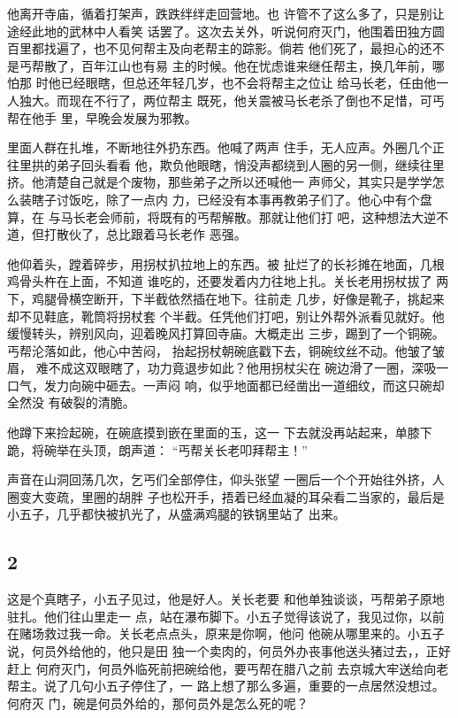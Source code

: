 他离开寺庙，循着打架声，跌跌绊绊走回营地。也
许管不了这么多了，只是别让途经此地的武林中人看笑
话罢了。这次去关外，听说何府灭门，他围着田独方圆
百里都找遍了，也不见何帮主及向老帮主的踪影。倘若
他们死了，最担心的还不是丐帮散了，百年江山也有易
主的时候。他在忧虑谁来继任帮主，换几年前，哪怕那
时他已经眼瞎，但总还年轻几岁，也不会将帮主之位让
给马长老，任由他一人独大。而现在不行了，两位帮主
既死，他关震被马长老杀了倒也不足惜，可丐帮在他手
里，早晚会发展为邪教。

里面人群在扎堆，不断地往外扔东西。他喊了两声
住手，无人应声。外圈几个正往里拱的弟子回头看看
他，欺负他眼瞎，悄没声都绕到人圈的另一侧，继续往里
挤。他清楚自己就是个废物，那些弟子之所以还喊他一
声师父，其实只是学学怎么装瞎子讨饭吃，除了一点内
力，已经没有本事再教弟子们了。他心中有个盘算，在
与马长老会师前，将既有的丐帮解散。那就让他们打
吧，这种想法大逆不道，但打散伙了，总比跟着马长老作
恶强。

他仰着头，蹚着碎步，用拐杖扒拉地上的东西。被
扯烂了的长衫摊在地面，几根鸡骨头杵在上面，不知道
谁吃的，还要发着内力往地上扎。关长老用拐杖拔了
两下，鸡腿骨横空断开，下半截依然插在地下。往前走
几步，好像是靴子，挑起来却不见鞋底，靴筒将拐杖套
个半截。任凭他们打吧，别让外帮外派看见就好。他
缓慢转头，辨别风向，迎着晚风打算回寺庙。大概走出
三步，踢到了一个铜碗。丐帮沦落如此，他心中苦闷，
抬起拐杖朝碗底戳下去，铜碗纹丝不动。他皱了皱眉，
难不成这双眼瞎了，功力竟退步如此？他用拐杖尖在
碗边滑了一圈，深吸一口气，发力向碗中砸去。一声闷
响，似乎地面都已经凿出一道细纹，而这只碗却全然没
有破裂的清脆。

他蹲下来捡起碗，在碗底摸到嵌在里面的玉，这一
下去就没再站起来，单膝下跪，将碗举在头顶，朗声道：
“丐帮关长老叩拜帮主！”

声音在山洞回荡几次，乞丐们全部停住，仰头张望
一圈后一个个开始往外挤，人圈变大变疏，里圈的胡胖
子也松开手，捂着已经血凝的耳朵看二当家的，最后是
小五子，几乎都快被扒光了，从盛满鸡腿的铁锅里站了
出来。
\newline

{\centering\subsection{2}}

这是个真瞎子，小五子见过，他是好人。关长老要
和他单独谈谈，丐帮弟子原地驻扎。他们往山里走一
点，站在瀑布脚下。小五子觉得该说了，我见过你，以前
在赌场救过我一命。关长老点点头，原来是你啊，他问
他碗从哪里来的。小五子说，何员外给他的，他只是田
独一个卖肉的，何员外办丧事他送头猪过去，，正好赶上
何府灭门，何员外临死前把碗给他，要丐帮在腊八之前
去京城大牢送给向老帮主。说了几句小五子停住了，一
路上想了那么多遍，重要的一点居然没想过。何府灭
门，碗是何员外给的，那何员外是怎么死的呢？

